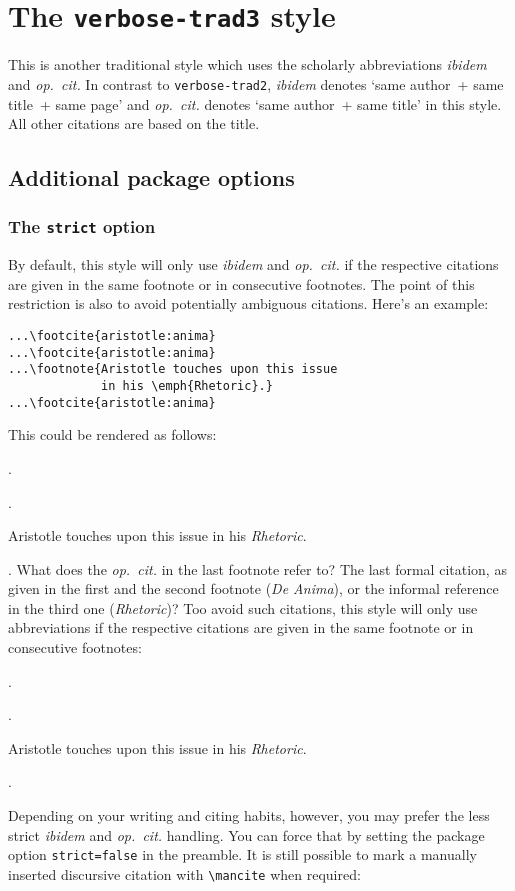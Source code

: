 \documentclass[a4paper]{article}
\newcommand{\cmd}[1]{\texttt{\textbackslash #1}}
\newenvironment*{pseudofootnotes}
  {\list\labelenumi{%
     \def\makelabel##1{\hss\llap{##1}}%
     \def\labelenumi{\theenumi}%
     \usecounter{enumi}%
     \setlength{\leftmargin}{0pt}%
     \setlength{\labelsep}{0.75em}%
     \setlength{\itemsep}{0pt}%
     \setlength{\parsep}{0pt}}%
   \citereset
   \footnotesize
   \def\footcite##1{\item\Cite{##1}.}%
   \def\footnote##1{\item##1}}
  {\endlist}
\newenvironment*{pseudofootnotes*}
  {\pseudofootnotes
   \def\footnote##1{\item##1\mancite}}
  {\endpseudofootnotes}
\begin{document}
\section*{The \texttt{verbose-trad3} style}

This is another traditional style which uses the scholarly
abbreviations \emph{ibidem} and \emph{op.~cit.} In contrast to
\texttt{verbose-trad2}, \emph{ibidem} denotes `same author~+ same
title~+ same page' and \emph{op.~cit.} denotes `same author~+ same
title' in this style. All other citations are based on the title.

\subsection*{Additional package options}

\subsubsection*{The \texttt{strict} option}

By default, this style will only use \emph{ibidem} and
\emph{op.~cit.} if the respective citations are given in the same
footnote or in consecutive footnotes. The point of this restriction
is also to avoid potentially ambiguous citations. Here's an example:

\begin{verbatim}
...\footcite{aristotle:anima}
...\footcite{aristotle:anima}
...\footnote{Aristotle touches upon this issue 
             in his \emph{Rhetoric}.}
...\footcite{aristotle:anima}
\end{verbatim}
%
This could be rendered as follows:

\begin{pseudofootnotes}
\footcite{aristotle:anima}
\footcite{aristotle:anima}
\footnote{Aristotle touches upon this issue in his \emph{Rhetoric}.}
\footcite{aristotle:anima}
\end{pseudofootnotes}
%
What does the \emph{op.~cit.} in the last footnote refer to? The
last formal citation, as given in the first and the second footnote
(\emph{De Anima}), or the informal reference in the third one
(\emph{Rhetoric})? Too avoid such citations, this style will only
use abbreviations if the respective citations are given in the same
footnote or in consecutive footnotes:

\begin{pseudofootnotes*}
\footcite{aristotle:anima}
\footcite{aristotle:anima}
\footnote{Aristotle touches upon this issue in his \emph{Rhetoric}.}
\footcite{aristotle:anima}
\end{pseudofootnotes*}
%
Depending on your writing and citing habits, however, you may prefer
the less strict \emph{ibidem} and \emph{op.~cit.} handling. You can
force that by setting the package option \texttt{strict=false} in
the preamble. It is still possible to mark a manually inserted
discursive citation with \cmd{mancite} when required:
\end{document}
